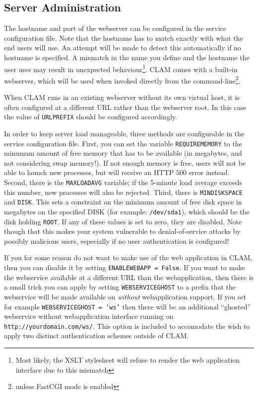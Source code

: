 \documentclass[a4paper,12pt]{report}
\begin{document}
\subsection{Server Administration}
\label{sec:sadmin}

The hostname and port of the webserver can be configured in the service configuration file. Note that the hostname has to match exactly with what the end users will use. An attempt will be made to detect this automatically if no hostname is specified. A mismatch in the name you define and the hostname the user uses may result in unexpected behaviour\footnote{Most likely, the XSLT stylesheet will refuse to render the web application interface due to this mismatch}. CLAM comes with a built-in webserver, which will be used when invoked directly from the command-line\footnote{unless FastCGI mode is enabled}.

When CLAM runs in an existing webserver without its own virtual host, it is often configured at a different URL rather than the webserver root. In this case the value of \texttt{URLPREFIX} should be configured accordingly.

In order to keep server load manageable, three methods are configurable in the service configuration file. First, you can set the variable \texttt{REQUIREMEMORY} to the minumum amount of free memory that has to be available (in megabytes, and not considering swap memory!). If not enough memory is free, users will not be able to launch new processes, but will receive an HTTP 500 error instead. Second, there is the \texttt{MAXLOADAVG} variable; if the 5-minute load average exceeds this number, new processes will also be rejected. Third, there is \texttt{MINDISKSPACE} and \texttt{DISK}. This sets a constraint on the minimum amount of free disk space in megabytes on the specified DISK (for example: \texttt{/dev/sda1}), which should be the disk holding \texttt{ROOT}. If any of these values is set to zero, they are disabled. Note though that this makes your system vulnerable to denial-of-service attacks by possibly malicious users, especially if no user authentication is configured!

If you for some reason do not want to make use of the web application in CLAM, then you can disable it by setting \texttt{ENABLEWEBAPP = False}. If you want to make the webservice available at a different URL than the webapplication, then there is a small trick you can apply by setting \texttt{WEBSERVICEGHOST} to a prefix that the webservice will be made available on \emph{without} webapplication support. If you set for example \texttt{WEBSERVICEGHOST = 'ws'} then there will be an additional ``ghosted'' webservice without webapplication interface running on \texttt{http://yourdomain.com/ws/}. This option is included to accomodate the wish to apply two distinct authentication schemes outside of CLAM. 
\end{document}
